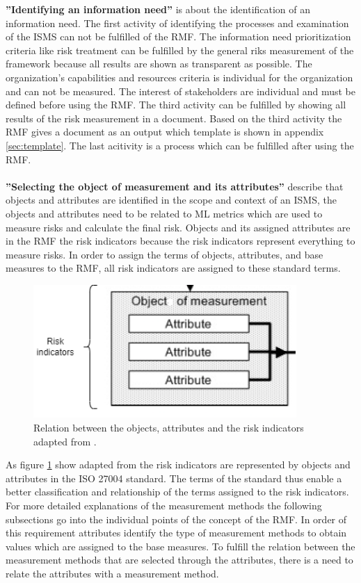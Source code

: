 \textbf{''Identifying an information need''} is about the identification of an information need. The first activity of identifying the processes and examination of the ISMS can not be fulfilled of the RMF. The information need prioritization criteria like risk treatment can be fulfilled by the general riks measurement of the framework because all results are shown as transparent as possible. The organization's capabilities and resources criteria is individual for the organization and can not be measured. The interest of stakeholders are individual and must be defined before using the RMF. The third activity can be fulfilled by showing all results of the risk measurement in a document. Based on the third activity the RMF gives a document as an output which template is shown in appendix \ref{sec:template}. The last acitivity is a process which can be fulfilled after using the RMF. \\ \\

\textbf{''Selecting the object of measurement and its attributes''} describe that objects and attributes are identified in the scope and context of an ISMS, the objects and attributes need to be related to ML metrics which are used to measure risks and calculate the final risk. Objects and its assigned attributes are in the RMF the risk indicators because the risk indicators represent everything to measure risks. In order to assign the terms of objects, attributes, and base measures to the RMF, all risk indicators are assigned to these standard terms.

\begin{figure}[ht!]
  \centering
  \includegraphics[width=10cm]{pictures/relation_risk_ind.png}
  \caption{Relation between the objects, attributes and the risk indicators adapted from \cite{ISO_27004_2009}.}
  \label{fig:relation_risk_ind}
\end{figure}

As figure \ref{fig:relation_risk_ind} show adapted from \cite{ISO_27004_2009} the risk indicators are represented by objects and attributes in the ISO 27004 \cite{ISO_27004_2009} standard.
The terms of the standard thus enable a better classification and relationship of the terms assigned to the risk indicators. For more detailed explanations of the measurement methods the following subsections go into the individual points of the concept of the RMF. In order of this requirement attributes identify the type of measurement methods to obtain values which are assigned to the base measures. To fulfill the relation between the measurement methods that are selected through the attributes, there is a need to relate the attributes with a measurement method. \\ \\

